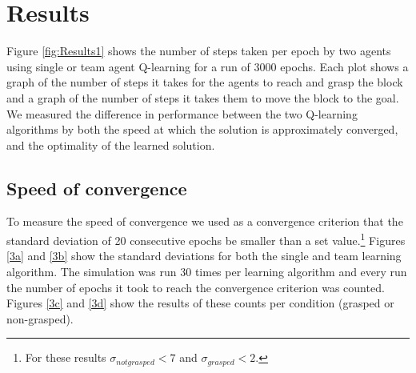 \section{Results}
Figure \ref{fig:Results1} shows the number of steps taken per epoch by two agents using single or team agent Q-learning for a run of 3000 epochs. Each plot shows a graph of the number of steps it takes for the agents to reach and grasp the block and a graph of the number of steps it takes them to move the block to the goal. We measured the difference in performance between the two Q-learning algorithms by both the speed at which the solution is approximately converged, and the optimality of the learned solution. 

\subsection{Speed of convergence}
To measure the speed of convergence we used as a convergence criterion that the standard deviation of 20 consecutive epochs be smaller than a set value.\footnote{For these results $\sigma_{not grasped} < 7$ and $\sigma_{grasped} < 2$.} Figures \ref{3a} and \ref{3b} show the standard deviations for both the single and team learning algorithm. The simulation was run 30 times per learning algorithm and every run the number of epochs it took to reach the convergence criterion was counted. Figures \ref{3c} and \ref{3d} show the results of these counts per condition (grasped or non-grasped).

